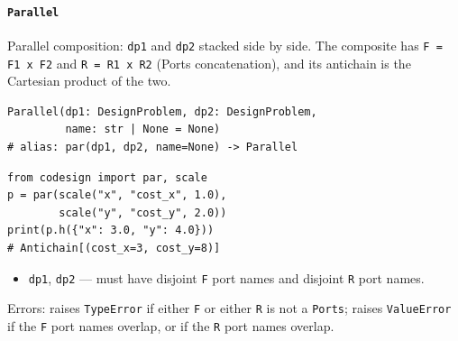 \documentclass[11pt,a4paper]{article}
\begin{document}
\paragraph{\texttt{Parallel}}
\label{ref:composition:parallel}
Parallel composition: \texttt{dp1} and \texttt{dp2} stacked side by side.
The composite has \texttt{F = F1 x F2} and \texttt{R = R1 x R2} (Ports
concatenation), and its antichain is the Cartesian product of the two.
\begin{lstlisting}
Parallel(dp1: DesignProblem, dp2: DesignProblem,
         name: str | None = None)
# alias: par(dp1, dp2, name=None) -> Parallel
\end{lstlisting}
\begin{lstlisting}
from codesign import par, scale
p = par(scale("x", "cost_x", 1.0),
        scale("y", "cost_y", 2.0))
print(p.h({"x": 3.0, "y": 4.0}))
# Antichain[(cost_x=3, cost_y=8)]
\end{lstlisting}
\begin{itemize}[nosep]
  \item \texttt{dp1}, \texttt{dp2} --- must have disjoint \texttt{F} port
        names and disjoint \texttt{R} port names.
\end{itemize}
Errors: raises \texttt{TypeError} if either \texttt{F} or either
\texttt{R} is not a \texttt{Ports}; raises \texttt{ValueError} if the
\texttt{F} port names overlap, or if the \texttt{R} port names overlap.
\end{document}
